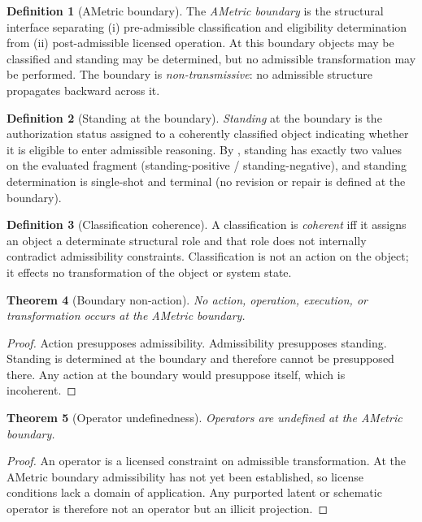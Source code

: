 \documentclass[11pt]{article}
\newtheorem{theorem}{Theorem}[section]
\theoremstyle{definition}
\newtheorem{definition}[theorem]{Definition}
\begin{document}
\begin{definition}[AMetric boundary]
\label{def:AB}
The \emph{AMetric boundary} is the structural interface separating (i) pre-admissible classification and eligibility determination from (ii) post-admissible licensed operation.
At this boundary objects may be classified and standing may be determined, but no admissible transformation may be performed.
The boundary is \emph{non-transmissive}: no admissible structure propagates backward across it.
\end{definition}

\begin{definition}[Standing at the boundary]
\label{def:standing-boundary}
\emph{Standing} at the boundary is the authorization status assigned to a coherently classified object indicating whether it is eligible to enter admissible reasoning.
By , standing has exactly two values on the evaluated fragment (standing-positive / standing-negative), and standing determination is single-shot and terminal (no revision or repair is defined at the boundary).
\end{definition}

\begin{definition}[Classification coherence]
A classification is \emph{coherent} iff it assigns an object a determinate structural role and that role does not internally contradict admissibility constraints.
Classification is not an action on the object; it effects no transformation of the object or system state.
\end{definition}

\begin{theorem}[Boundary non-action]
\label{thm:boundary-nonaction}
No action, operation, execution, or transformation occurs at the AMetric boundary.
\end{theorem}

\begin{proof}
Action presupposes admissibility. Admissibility presupposes standing.
Standing is determined at the boundary and therefore cannot be presupposed there.
Any action at the boundary would presuppose itself, which is incoherent.
\end{proof}

\begin{theorem}[Operator undefinedness]
\label{thm:operator-undef}
Operators are undefined at the AMetric boundary.
\end{theorem}

\begin{proof}
An operator is a licensed constraint on admissible transformation.
At the AMetric boundary admissibility has not yet been established, so license conditions lack a domain of application.
Any purported latent or schematic operator is therefore not an operator but an illicit projection.
\end{proof}
\end{document}
